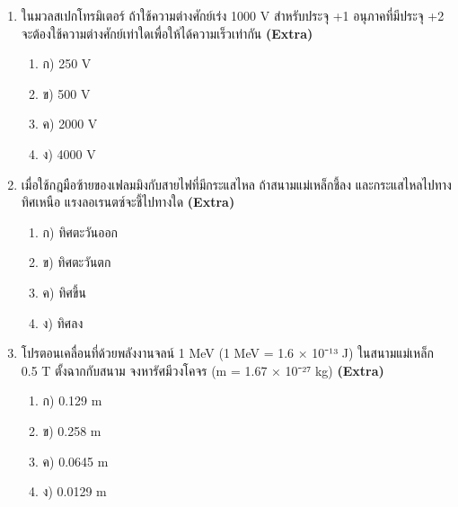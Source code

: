 \documentclass[12pt]{article}
\begin{document}
\begin{enumerate}[label=\arabic*.]
\begin{enumerate}[label=)]
\item ง) ประจุของอนุภาคเท่านั้น
\end{enumerate}
\item ในมวลสเปกโทรมิเตอร์ ถ้าใช้ความต่างศักย์เร่ง 1000 V สำหรับประจุ +1 อนุภาคที่มีประจุ +2 จะต้องใช้ความต่างศักย์เท่าใดเพื่อให้ได้ความเร็วเท่ากัน \hfill \textbf{\small (Extra)}
\begin{enumerate}[label=)]
\item ก) 250 V
\item ข) 500 V
\item ค) 2000 V
\item ง) 4000 V
\end{enumerate}
\item เมื่อใช้กฎมือซ้ายของเฟลมมิงกับสายไฟที่มีกระแสไหล ถ้าสนามแม่เหล็กชี้ลง และกระแสไหลไปทางทิศเหนือ แรงลอเรนตซ์จะชี้ไปทางใด \hfill \textbf{\small (Extra)}
\begin{enumerate}[label=)]
\item ก) ทิศตะวันออก
\item ข) ทิศตะวันตก
\item ค) ทิศขึ้น
\item ง) ทิศลง
\end{enumerate}
\item โปรตอนเคลื่อนที่ด้วยพลังงานจลน์ 1 MeV (1 MeV = 1.6 × 10⁻¹³ J) ในสนามแม่เหล็ก 0.5 T ตั้งฉากกับสนาม จงหารัศมีวงโคจร (m = 1.67 × 10⁻²⁷ kg) \hfill \textbf{\small (Extra)}
\begin{enumerate}[label=)]
\item ก) 0.129 m
\item ข) 0.258 m
\item ค) 0.0645 m
\item ง) 0.0129 m
\end{enumerate}
\end{enumerate}
\end{document}
